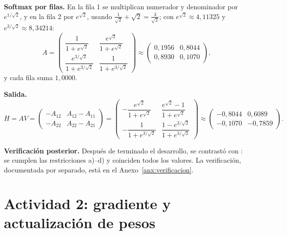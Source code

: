 \documentclass[10pt]{article}
\begin{document}
\textbf{Softmax por filas.} En la fila 1 se multiplican numerador y denominador por $e^{1/\sqrt2}$, y en
la fila 2 por $e^{\sqrt2}$, usando $\tfrac1{\sqrt2}+\sqrt2 = \tfrac3{\sqrt2}$; con
$e^{\sqrt2}\approx4{,}11325$ y $e^{3/\sqrt2}\approx8{,}34214$:
\[
  A = \begin{pmatrix}\dfrac{1}{1+e^{\sqrt2}} & \dfrac{e^{\sqrt2}}{1+e^{\sqrt2}}\\[2ex]
                     \dfrac{e^{3/\sqrt2}}{1+e^{3/\sqrt2}} & \dfrac{1}{1+e^{3/\sqrt2}}\end{pmatrix}
  \approx \begin{pmatrix}0{,}1956&0{,}8044\\0{,}8930&0{,}1070\end{pmatrix},
\]
y cada fila suma $1{,}0000$.

\textbf{Salida.}
\[
  H = AV = \begin{pmatrix}-A_{12} & A_{12}-A_{11}\\ -A_{22} & A_{22}-A_{21}\end{pmatrix}
  = \begin{pmatrix}-\dfrac{e^{\sqrt2}}{1+e^{\sqrt2}} & \dfrac{e^{\sqrt2}-1}{1+e^{\sqrt2}}\\[2ex]
                   -\dfrac{1}{1+e^{3/\sqrt2}} & \dfrac{1-e^{3/\sqrt2}}{1+e^{3/\sqrt2}}\end{pmatrix}
  \approx \begin{pmatrix}-0{,}8044&0{,}6089\\-0{,}1070&-0{,}7859\end{pmatrix}.
\]

\textbf{Verificación posterior.} Después de terminado el desarrollo, se contrastó con
: se cumplen las restricciones a)--d) y coinciden todos los valores.
La verificación, documentada por separado, está en el Anexo~\ref{anx:verificacion}.

\section{Actividad 2: gradiente y actualización de pesos}
\end{document}

